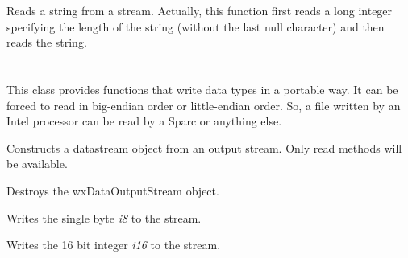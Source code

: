 

Reads a string from a stream. Actually, this function first reads a long integer
specifying the length of the string (without the last null character) and then
reads the string.


\section{}\label{wxdataoutputstream}

This class provides functions that write data types in a
portable way. It can be forced to read in big-endian order or 
little-endian order. So, a file written by an Intel processor can be read by a
Sparc or anything else.


\label{wxdataoutputstreamconstr}


Constructs a datastream object from an output stream. Only read methods will
be available.





Destroys the wxDataOutputStream object.



Writes the single byte {\it i8} to the stream.



Writes the 16 bit integer {\it i16} to the stream.


